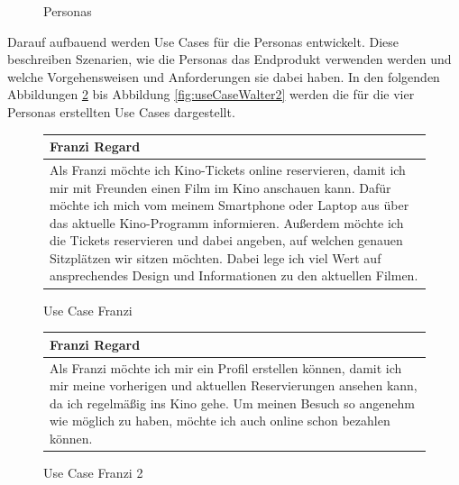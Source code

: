 \begin{figure}[H]
			\caption[Personas ]{\label{fig:personas}Personas}
		\end{figure} 

		
		Darauf aufbauend werden Use Cases für die Personas entwickelt. Diese beschreiben Szenarien, wie die Personas das Endprodukt verwenden werden und welche Vorgehensweisen und Anforderungen sie dabei haben. In den folgenden Abbildungen \ref{fig:useCaseFranzi} bis Abbildung \ref{fig:useCaseWalter2} werden die für die vier Personas erstellten Use Cases dargestellt.
		
		\begin{figure}[H]\begin{center}
			\begin{tabular}{p{}}
				\textbf{Franzi Regard} \\\toprule
				Als Franzi möchte ich Kino-Tickets online reservieren, damit ich mir mit Freunden einen Film im Kino anschauen kann. Dafür möchte ich mich vom meinem Smartphone oder Laptop aus über das aktuelle Kino-Programm informieren. Außerdem möchte ich die Tickets reservieren und dabei angeben, auf welchen genauen Sitzplätzen wir sitzen möchten. Dabei lege ich viel Wert auf ansprechendes Design und Informationen zu den aktuellen Filmen. 
			\end{tabular}
			\caption[Use Case Franzi]{\label{fig:useCaseFranzi} Use Case Franzi}
		\end{center}
		\end{figure}
	
		\begin{figure}[H] \begin{center}
			\begin{tabular}{p{}}
				\textbf{Franzi Regard} \\\toprule
				Als Franzi möchte ich mir ein Profil erstellen können, damit ich mir meine vorherigen und aktuellen Reservierungen ansehen kann, da ich regelmäßig ins Kino gehe. Um meinen Besuch so angenehm wie möglich zu haben, möchte ich auch online schon bezahlen können.
			\end{tabular}
			\caption[Use Case Franzi 2]{\label{fig:useCaseFranzi2} Use Case Franzi 2}
		\end{center}
		\end{figure}
	
